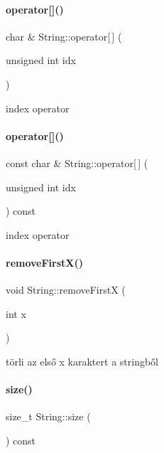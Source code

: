 \paragraph{\texorpdfstring{operator[]()}{operator[]()}\hspace{0.1cm}{\footnotesize\ttfamily [1/2]}}
{\footnotesize\ttfamily char \& String\+::operator\mbox{[}$\,$\mbox{]} (\begin{DoxyParamCaption}\item[{unsigned int}]{idx }\end{DoxyParamCaption})}



index operator 

\mbox{\label{class_string_aaa249e62641872197679cfc7c66118c0}} 
\paragraph{\texorpdfstring{operator[]()}{operator[]()}\hspace{0.1cm}{\footnotesize\ttfamily [2/2]}}
{\footnotesize\ttfamily const char \& String\+::operator\mbox{[}$\,$\mbox{]} (\begin{DoxyParamCaption}\item[{unsigned int}]{idx }\end{DoxyParamCaption}) const}



index operator 

\mbox{\label{class_string_a15c07ede44c5bcfb0920e9bf63e75670}} 
\paragraph{\texorpdfstring{removeFirstX()}{removeFirstX()}}
{\footnotesize\ttfamily void String\+::remove\+FirstX (\begin{DoxyParamCaption}\item[{int}]{x }\end{DoxyParamCaption})}



törli az első x karaktert a stringből 

\mbox{\label{class_string_a588c5cc9faededbb9d938662d354feed}} 
\paragraph{\texorpdfstring{size()}{size()}}
{\footnotesize\ttfamily size\+\_\+t String\+::size (\begin{DoxyParamCaption}{ }\end{DoxyParamCaption}) const\hspace{0.3cm}{\ttfamily [inline]}}



